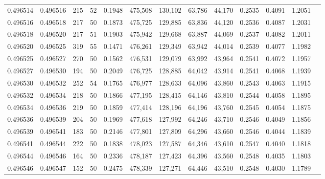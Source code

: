 \begin{tabular}{rrrrrrrrrrrrr}
0.496514 & 0.496516 &   215 &  52 &                                     0.1948 & 475,508 & 130,102 &  63,786 &  44,170 & 0.2535 & 0.4091 & 1.2051 \\
0.496516 & 0.496518 &   217 &  50 &                                     0.1873 & 475,725 & 129,885 &  63,836 &  44,120 & 0.2536 & 0.4087 & 1.2031 \\
0.496518 & 0.496520 &   217 &  51 &                                     0.1903 & 475,942 & 129,668 &  63,887 &  44,069 & 0.2537 & 0.4082 & 1.2011 \\
0.496520 & 0.496525 &   319 &  55 &                                     0.1471 & 476,261 & 129,349 &  63,942 &  44,014 & 0.2539 & 0.4077 & 1.1982 \\
0.496525 & 0.496527 &   270 &  50 &                                     0.1562 & 476,531 & 129,079 &  63,992 &  43,964 & 0.2541 & 0.4072 & 1.1957 \\
0.496527 & 0.496530 &   194 &  50 &                                     0.2049 & 476,725 & 128,885 &  64,042 &  43,914 & 0.2541 & 0.4068 & 1.1939 \\
0.496530 & 0.496532 &   252 &  54 &                                     0.1765 & 476,977 & 128,633 &  64,096 &  43,860 & 0.2543 & 0.4063 & 1.1915 \\
0.496532 & 0.496534 &   218 &  50 &                                     0.1866 & 477,195 & 128,415 &  64,146 &  43,810 & 0.2544 & 0.4058 & 1.1895 \\
0.496534 & 0.496536 &   219 &  50 &                                     0.1859 & 477,414 & 128,196 &  64,196 &  43,760 & 0.2545 & 0.4054 & 1.1875 \\
0.496536 & 0.496539 &   204 &  50 &                                     0.1969 & 477,618 & 127,992 &  64,246 &  43,710 & 0.2546 & 0.4049 & 1.1856 \\
0.496539 & 0.496541 &   183 &  50 &                                     0.2146 & 477,801 & 127,809 &  64,296 &  43,660 & 0.2546 & 0.4044 & 1.1839 \\
0.496541 & 0.496544 &   222 &  50 &                                     0.1838 & 478,023 & 127,587 &  64,346 &  43,610 & 0.2547 & 0.4040 & 1.1818 \\
0.496544 & 0.496546 &   164 &  50 &                                     0.2336 & 478,187 & 127,423 &  64,396 &  43,560 & 0.2548 & 0.4035 & 1.1803 \\
0.496546 & 0.496547 &   152 &  50 &                                     0.2475 & 478,339 & 127,271 &  64,446 &  43,510 & 0.2548 & 0.4030 & 1.1789 \\

\end{tabular}
